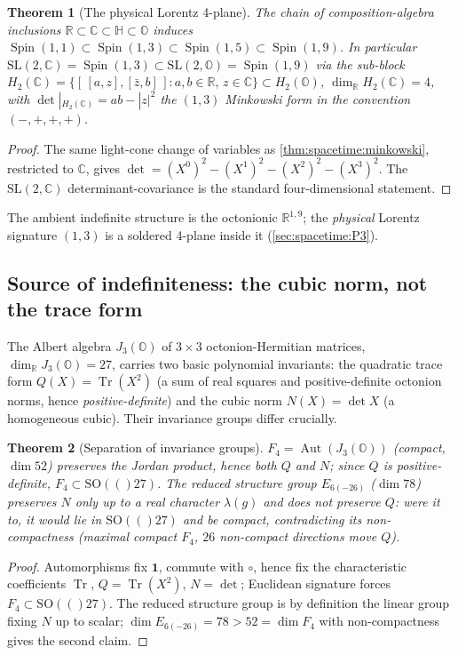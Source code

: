 \documentclass[11pt]{article}
\theoremstyle{plain}
\newtheorem{theorem}{Theorem}[section]
\theoremstyle{definition}
\theoremstyle{remark}
\newcommand{\SO}[1]{\mathrm{SO}(#1)}
\newcommand{\SL}{\mathrm{SL}}
\newcommand{\Spin}{\operatorname{Spin}}
\newcommand{\Aut}{\operatorname{Aut}}
\newcommand{\Tr}{\operatorname{Tr}}
\begin{document}
\begin{theorem}[The physical Lorentz 4-plane]
\label{thm:spacetime:lorentz4}
The chain of composition-algebra inclusions $\mathbb R\subset\mathbb C\subset\mathbb H\subset\mathbb O$
induces $\Spin(1,1)\subset\Spin(1,3)\subset\Spin(1,5)\subset\Spin(1,9)$. In particular
$\SL(2,\mathbb C)=\Spin(1,3)\subset\SL(2,\mathbb O)=\Spin(1,9)$ via the sub-block
$H_2(\mathbb C)=\{[\,[a,z],[\bar z,b]\,]:a,b\in\mathbb R,\,z\in\mathbb C\}\subset H_2(\mathbb O)$,
$\dim_{\mathbb R}H_2(\mathbb C)=4$, with $\det|_{H_2(\mathbb C)}=ab-|z|^2$ the $(1,3)$
Minkowski form in the convention $(-,+,+,+)$.
\end{theorem}
\begin{proof}
The same light-cone change of variables as \autoref{thm:spacetime:minkowski},
restricted to $\mathbb C$, gives $\det=(X^0)^2-(X^1)^2-(X^2)^2-(X^3)^2$. The
$\SL(2,\mathbb C)$ determinant-covariance is the standard four-dimensional statement.
\end{proof}

The ambient indefinite structure is the octonionic $\mathbb R^{1,9}$; the
\emph{physical} Lorentz signature $(1,3)$ is a soldered 4-plane inside it
(\autoref{sec:spacetime:P3}).

\subsection{Source of indefiniteness: the cubic norm, not the trace form}
\label{sec:spacetime:norm}

The Albert algebra $J_3(\mathbb O)$ of $3\times3$ octonion-Hermitian matrices,
$\dim_{\mathbb R}J_3(\mathbb O)=27$, carries two basic polynomial invariants: the
quadratic trace form $Q(X)=\Tr(X^2)$ (a sum of real squares and positive-definite
octonion norms, hence \emph{positive-definite}) and the cubic norm
$N(X)=\det X$ (a homogeneous cubic). Their invariance groups differ crucially.

\begin{theorem}[Separation of invariance groups]
\label{thm:spacetime:groups}
\label{thm:Invs}
$F_4=\Aut(J_3(\mathbb O))$ (compact, $\dim 52$) preserves the Jordan product, hence
\emph{both} $Q$ and $N$; since $Q$ is positive-definite, $F_4\subset\SO(27)$. The
reduced structure group $E_{6(-26)}$ ($\dim 78$) preserves $N$ only up to a real
character $\lambda(g)$ and does \emph{not} preserve $Q$: were it to, it would lie in
$\SO(27)$ and be compact, contradicting its non-compactness (maximal compact $F_4$,
$26$ non-compact directions move $Q$).
\end{theorem}
\begin{proof}
Automorphisms fix $\mathbf 1$, commute with $\circ$, hence fix the characteristic
coefficients $\Tr$, $Q=\Tr(X^2)$, $N=\det$; Euclidean signature forces
$F_4\subset\SO(27)$. The reduced structure group is by definition the linear group
fixing $N$ up to scalar; $\dim E_{6(-26)}=78>52=\dim F_4$ with non-compactness gives
the second claim.
\end{proof}
\end{document}

